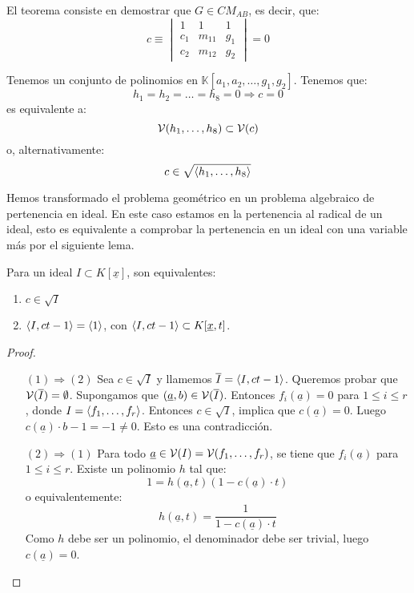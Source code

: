 \documentclass[twoside]{report}
\begin{document}
El teorema consiste en demostrar que $G \in CM_{AB}$, es decir, que:
\[ c \equiv \begin{vmatrix}1 & 1 & 1\\c_1 & m_{11} & g_1\\c_2 & m_{12} & g_2\end{vmatrix} = 0 \]

Tenemos un conjunto de polinomios en $\mathbb{K}[a_1,a_2,\dots,g_1,g_2]$.
Tenemos que:
\[ h_1=h_2=\dots=h_8 = 0 \Rightarrow c=0 \]
es equivalente a:
\[ \mathcal{V}(h_1,\dots,h_8) \subset \mathcal{V}(c) \]
o, alternativamente:
\[ c \in \sqrt{\langle{h_1,\dots,h_8}\rangle} \]

Hemos transformado el problema geométrico en un problema algebraico de pertenencia en ideal.
En este caso estamos en la pertenencia al radical de un ideal, esto es equivalente a comprobar la pertenencia en un ideal con una variable más por el siguiente lema.

\begin{lemma}
Para un ideal $I \subset K[\underline{x}]$, son equivalentes:
\begin{enumerate}
\item $c \in \sqrt{I}$
\item $\langle{I, ct-1}\rangle = \langle{1}\rangle$, con $\langle{I, ct-1}\rangle \subset K[\underline{x},t]$.
\end{enumerate}
\end{lemma}
\begin{proof}\mbox{}
\begin{itemize}
\item[$(1)\Rightarrow(2)$] Sea $c \in \sqrt{I}$ y llamemos $\overline{I} = \langle{I, ct-1}\rangle$.
Queremos probar que $\mathcal{V}(\overline{I})=\emptyset$.
Supongamos que $(\underline{a},b) \in \mathcal{V}(\overline{I})$.
Entonces $f_i(\underline{a}) = 0$ para $1\leq i \leq r$, donde $I = \langle{f_1,\dots,f_r}\rangle$.
Entonces $c \in \sqrt{I}$, implica que $c(\underline{a})=0$.
Luego $c(\underline{a})\cdot b - 1 = -1 \neq 0$.
Esto es una contradicción. 
\item[$(2)\Rightarrow(1)$] 
Para todo $\underline{a} \in \mathcal{V}(I) = \mathcal{V}(f_1,\dots,f_r)$, se tiene que $f_i(\underline{a})$ para $1\leq i \leq r$.
Existe un polinomio $h$ tal que:
\[ 1 = h(\underline{a},t)(1-c(\underline{a})\cdot t)\]
o equivalentemente:
\[ h(\underline{a},t) = \frac{1}{1-c(\underline{a})\cdot t} \]
Como $h$ debe ser un polinomio, el denominador debe ser trivial, luego $c(\underline{a}) = 0$.
\end{itemize}
\end{proof}
\end{document}
